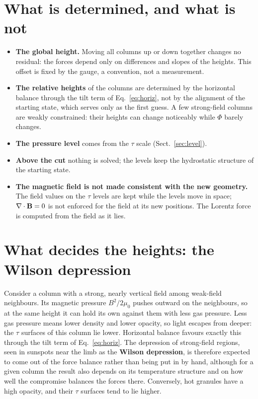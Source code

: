 \section{What is determined, and what is not}\label{sec:det}
\begin{itemize}
\item \textbf{The global height.} Moving all columns up or down together changes no residual: the forces depend only on
differences and slopes of the heights. This offset is fixed by the gauge, a convention, not a measurement.
\item \textbf{The relative heights} of the columns are determined by the horizontal balance through the tilt term of
Eq.~\eqref{eq:horiz}, not by the alignment of the starting state, which serves only as the first guess. A few strong-field
columns are weakly constrained: their heights can change noticeably while $\Phi$ barely changes.
\item \textbf{The pressure level} comes from the $\tau$ scale (Sect.~\ref{sec:level}).
\item \textbf{Above the cut} nothing is solved; the levels keep the hydrostatic structure of the starting state.
\item \textbf{The magnetic field is not made consistent with the new geometry.} The field values on the $\tau$ levels are kept
while the levels move in space; $\nabla\cdot\mathbf B=0$ is not enforced for the field at its new positions. The Lorentz force is
computed from the field as it lies.
\end{itemize}

\section{What decides the heights: the Wilson depression}
Consider a column with a strong, nearly vertical field among weak-field neighbours. Its magnetic pressure $B^2/2\mu_0$ pushes
outward on the neighbours, so at the same height it can hold its own against them with less gas pressure. Less gas pressure
means lower density and lower opacity, so light escapes from deeper: the $\tau$ surfaces of this column lie lower. Horizontal
balance favours exactly this through the tilt term of Eq.~\eqref{eq:horiz}. The depression of strong-field regions, seen in
sunspots near the limb as the \textbf{Wilson depression}, is therefore expected to come out of the force balance rather than
being put in by hand, although for a given column the result also depends on its temperature structure and on how well the
compromise balances the forces there. Conversely, hot granules have a high opacity, and their $\tau$ surfaces tend to lie
higher.

